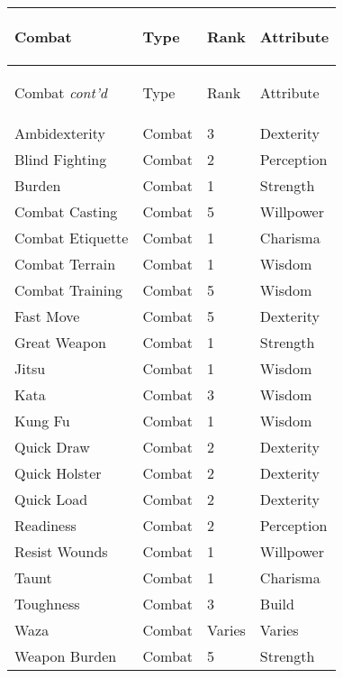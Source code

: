 \documentclass[twoside]{book}
\begin{document}
\begin{longtable}{p{1.25in}lll} 
  Combat& \begin{turn}{70}{Type}\end{turn}
          & \begin{turn}{70}{Rank}\end{turn}
          & \begin{turn}{70}{Attribute}\end{turn}
          \\
  \hline
  \hline
  \endfirsthead
  Combat \textit{cont'd}
        & \begin{turn}{70}{Type}\end{turn}
          & \begin{turn}{70}{Rank}\end{turn}
          & \begin{turn}{70}{Attribute}\end{turn}
           \\
  \hline
  \endhead
\raggedright Ambidexterity&Combat&3&Dexterity\tabularnewline
      \raggedright Blind Fighting&Combat&2&Perception\tabularnewline
      \raggedright Burden&Combat&1&Strength\tabularnewline
      \raggedright Combat Casting&Combat&5&Willpower\tabularnewline
      \raggedright Combat Etiquette&Combat&1&Charisma\tabularnewline
      \raggedright Combat Terrain&Combat&1&Wisdom\tabularnewline
      \raggedright Combat Training&Combat&5&Wisdom\tabularnewline
      \raggedright Fast Move&Combat&5&Dexterity\tabularnewline
      \raggedright Great Weapon&Combat&1&Strength\tabularnewline
      \raggedright Jitsu&Combat&1&Wisdom\tabularnewline
      \raggedright Kata&Combat&3&Wisdom\tabularnewline
      \raggedright Kung Fu&Combat&1&Wisdom\tabularnewline
      \raggedright Quick Draw&Combat&2&Dexterity\tabularnewline
      \raggedright Quick Holster&Combat&2&Dexterity\tabularnewline
      \raggedright Quick Load&Combat&2&Dexterity\tabularnewline
      \raggedright Readiness&Combat&2&Perception\tabularnewline
      \raggedright Resist Wounds&Combat&1&Willpower\tabularnewline
      \raggedright Taunt&Combat&1&Charisma\tabularnewline
      \raggedright Toughness&Combat&3&Build\tabularnewline
      \raggedright Waza&Combat&Varies&Varies\tabularnewline
      \raggedright Weapon Burden&Combat&5&Strength\tabularnewline
      
\end{longtable}
    
\end{document}
